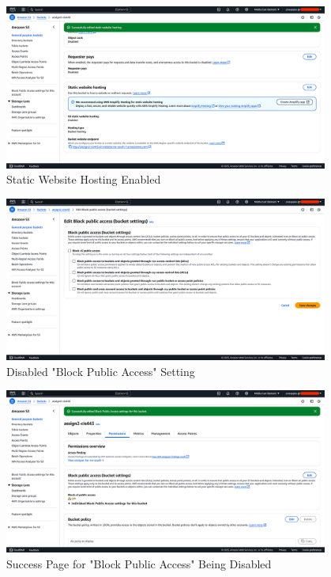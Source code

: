 \documentclass[a4paper,12pt]{article}
\begin{document}
\begin{figure}[H]
    \centering
    \includegraphics[width=0.95\textwidth]{host-static-website-7.png}
    \caption{Static Website Hosting Enabled}
    \label{fig:static7}
\end{figure}

\begin{figure}[H]
    \centering
    \includegraphics[width=0.95\textwidth]{host-static-website-8.png}
    \caption{Disabled "Block Public Access" Setting}
    \label{fig:static8}
\end{figure}

\begin{figure}[H]
    \centering
    \includegraphics[width=0.95\textwidth]{host-static-website-9.png}
    \caption{Success Page for "Block Public Access" Being Disabled}
    \label{fig:static9}
\end{figure}
\end{document}
